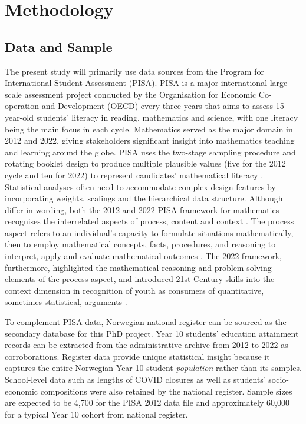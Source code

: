 \documentclass[
    a4paper,                %
    11pt,                   %
    stu,                    %
    donotrepeattitle,       %
    floatsintext,           %
    biblatex,               %
    colorlinks=true,        %
    linkcolor=red,          %
    anchorcolor=black,      %
    citecolor=blue,         %
    urlcolor=blue,          %
    bookmarks=true,         %
    bookmarksopen=false,    %
    bookmarksnumbered=true, %
    dvipsnames              %
]{apa7}
\begin{document}
\section{Methodology}

\subsection{Data and Sample}

The present study will primarily use data sources from the Program for International Student Assessment (PISA). PISA is a major international large-scale assessment project conducted by the Organisation for Economic Co-operation and Development (OECD) every three years that aims to assess 15-year-old students' literacy in reading, mathematics and science, with one literacy being the main focus in each cycle. Mathematics served as the major domain in 2012 and 2022, giving stakeholders significant insight into mathematics teaching and learning around the globe. PISA uses the two-stage sampling procedure and rotating booklet design to produce multiple plausible values (five for the 2012 cycle and ten for 2022) to represent candidates' mathematical literacy \parencite{rust:2014}. Statistical analyses often need to accommodate complex design features by incorporating weights, scalings and the hierarchical data structure. Although differ in wording, both the 2012 and 2022 PISA framework for mathematics recognises the interrelated aspects of process, content and context \parencite{oecd:2013}. The process aspect refers to an individual's capacity to formulate situations mathematically, then to employ mathematical concepts, facts, procedures, and reasoning to interpret, apply and evaluate mathematical outcomes \parencite[][p. 28]{oecd:2013}. The 2022 framework, furthermore, highlighted the mathematical reasoning and problem-solving elements of the process aspect, and introduced 21st Century skills into the context dimension in recognition of youth as consumers of quantitative, sometimes statistical, arguments \parencite{oecd:2018}.

To complement PISA data, Norwegian national register can be sourced as the secondary database for this PhD project. Year 10 students' education attainment records can be extracted from the administrative archive from 2012 to 2022 as corroborations. Register data provide unique statistical insight because it captures the entire Norwegian Year 10 student \emph{population} rather than its samples. School-level data such as lengths of COVID closures as well as students' socio-economic compositions were also retained by the national register. Sample sizes are expected to be 4,700 for the PISA 2012 data file \parencite{oecd:2014} and approximately 60,000 for a typical Year 10 cohort from national register.
\end{document}
